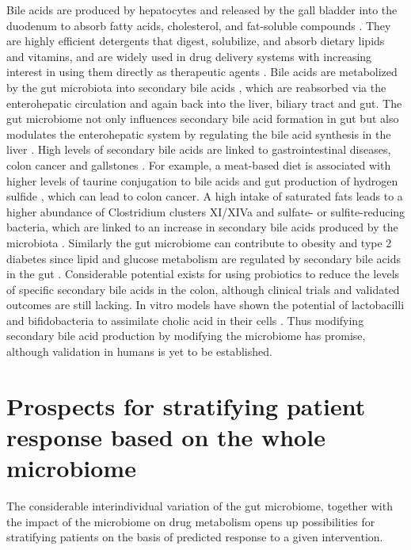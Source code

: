 Bile acids are produced by hepatocytes and released by the gall bladder into the duodenum to absorb fatty acids, cholesterol, and fat-soluble compounds \cite{RN4147}. They are highly efficient detergents that digest, solubilize, and absorb dietary lipids and vitamins, and are widely used in drug delivery systems with increasing interest in using them directly as therapeutic agents \cite{RN4148}. Bile acids are metabolized by the gut microbiota into secondary bile acids \cite{RN4149}, which  are reabsorbed  via the enterohepatic circulation and again back into the liver, biliary tract and gut. The gut microbiome not only influences secondary bile acid formation in gut but also modulates the enterohepatic system by regulating the bile acid synthesis in the liver \cite{RN4150}. High levels of secondary bile acids are linked to gastrointestinal diseases, colon cancer and gallstones \cite{RN4152}. For example, a meat-based diet is associated with higher levels of taurine conjugation to bile acids and gut production of hydrogen sulfide \cite{RN4153}, which can lead to colon cancer. A high intake of saturated fats leads to a higher abundance of Clostridium clusters XI/XIVa and sulfate- or sulfite-reducing bacteria, which are linked to an increase in secondary bile acids produced by the microbiota \cite{RN4154}. Similarly the gut microbiome can contribute to obesity and type 2 diabetes since lipid and glucose metabolism are regulated by secondary bile acids in the gut \cite{RN4155}. Considerable potential exists for using probiotics to reduce the levels of specific secondary bile acids in the colon, although clinical trials and validated outcomes are still lacking. In vitro models have shown the potential of lactobacilli and bifidobacteria to assimilate cholic acid in their cells \cite{RN4156}. Thus modifying secondary bile acid production by modifying the microbiome  has promise, although validation in humans is yet to be established.

\section{Prospects for stratifying patient response based on the whole microbiome}

The considerable interindividual variation of the gut microbiome, together with the impact of the microbiome on drug metabolism opens up possibilities for stratifying patients on the basis of predicted response to a given intervention. 

